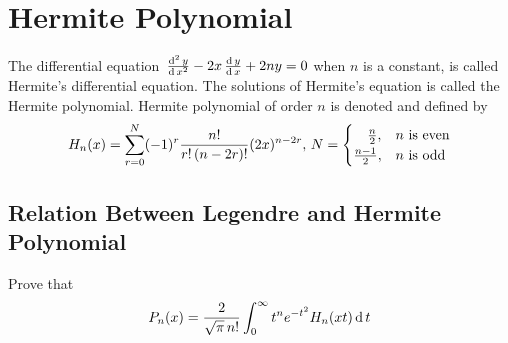 \documentclass[../main-sheet.tex]{subfiles}
\begin{document}
\chapter{Hermite Polynomial}
The differential equation \( \,\frac{\mathrm{d}^{2}\, y}{\mathrm{d}\, x^{2}}-2x\,\frac{\mathrm{d}\,y}{\mathrm{d}\,x}+2ny=0 \) when \( n \) is a constant, is called Hermite's differential equation. The solutions of Hermite's equation is called the Hermite polynomial. Hermite polynomial of order \( n \) is denoted and defined by
\begin{equation}
    H_n(x)=\sum_{r=0}^N (-1)^r \frac{n!}{r!\,(n-2r)!}(2x)^{n-2r},\, N=
    \begin{cases}
        \quad \frac{n}{2}, & n \text{ is even} \\
        \frac{n-1}{2},     & n \text{ is odd}
    \end{cases}\label{eq:hnx}
\end{equation}
\section{Relation Between Legendre and Hermite Polynomial}
\begin{prob}
    Prove that
    \[
        P_n(x)=\frac{2}{\sqrt{\pi}\,n!}\int_0^\infty t^ne^{-t^2}H_n(xt)\,\mathrm{d}\, t
    \]
\end{prob}
\end{document}
